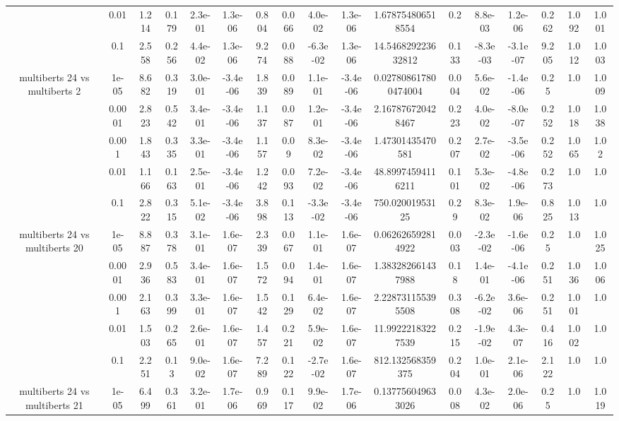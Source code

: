 \begin{tabular}{|c|c|c|c|c|c|c|c|c|c|c|c|c|c|c|c|c|}
 & 0.01 & 1.214 & 0.179 & 2.3e-01 & 1.3e-06 & 0.804 & 0.066 & 4.0e-02 & 1.3e-06 & 1.678754806518554 & 0.2 & 8.8e-03 & 1.2e-06 & 0.262 & 1.092 & 1.001 \\
 & 0.1 & 2.558 & 0.256 & 4.4e-02 & 1.3e-06 & 9.274 & 0.088 & -6.3e-02 & 1.3e-06 & 14.546829223632812 & 0.133 & -8.3e-03 & -3.1e-07 & 9.205 & 1.012 & 1.003 \\
\hline
\multirow{5}{*}{multiberts 24 vs multiberts 2} & 1e-05 & 8.682 & 0.319 & 3.0e-01 & -3.4e-06 & 1.839 & 0.089 & 1.1e-01 & -3.4e-06 & 0.027808617800474004 & 0.004 & 5.6e-02 & -1.4e-06 & 0.25 & 1.0 & 1.009 \\
 & 0.0001 & 2.823 & 0.542 & 3.4e-01 & -3.4e-06 & 1.137 & 0.087 & 1.2e-01 & -3.4e-06 & 2.167876720428467 & 0.223 & 4.0e-02 & -8.0e-07 & 0.252 & 1.018 & 1.038 \\
 & 0.001 & 1.843 & 0.335 & 3.3e-01 & -3.4e-06 & 1.157 & 0.09 & 8.3e-02 & -3.4e-06 & 1.47301435470581 & 0.207 & 2.7e-02 & -3.5e-06 & 0.252 & 1.065 & 1.02 \\
 & 0.01 & 1.166 & 0.163 & 2.5e-01 & -3.4e-06 & 1.242 & 0.093 & 7.2e-02 & -3.4e-06 & 48.89974594116211 & 0.101 & 5.3e-02 & -4.8e-06 & 0.273 & 1.0 & 1.0 \\
 & 0.1 & 2.822 & 0.315 & 5.1e-02 & -3.4e-06 & 3.898 & 0.113 & -3.3e-02 & -3.4e-06 & 750.02001953125 & 0.29 & 8.3e-02 & 1.9e-06 & 0.825 & 1.013 & 1.0 \\
\hline
\multirow{5}{*}{multiberts 24 vs multiberts 20} & 1e-05 & 8.887 & 0.378 & 3.1e-01 & 1.6e-07 & 2.339 & 0.067 & 1.1e-01 & 1.6e-07 & 0.062626592814922 & 0.003 & -2.3e-02 & -1.6e-06 & 0.25 & 1.0 & 1.025 \\
 & 0.0001 & 2.936 & 0.583 & 3.4e-01 & 1.6e-07 & 1.572 & 0.094 & 1.4e-01 & 1.6e-07 & 1.383282661437988 & 0.18 & 1.4e-01 & -4.1e-06 & 0.251 & 1.036 & 1.006 \\
 & 0.001 & 2.163 & 0.399 & 3.3e-01 & 1.6e-07 & 1.542 & 0.129 & 6.4e-02 & 1.6e-07 & 2.228731155395508 & 0.308 & -6.2e-02 & 3.6e-06 & 0.251 & 1.001 & 1.0 \\
 & 0.01 & 1.503 & 0.265 & 2.6e-01 & 1.6e-07 & 1.457 & 0.221 & 5.9e-02 & 1.6e-07 & 11.99222183227539 & 0.215 & -1.9e-02 & 4.3e-07 & 0.416 & 1.002 & 1.0 \\
 & 0.1 & 2.251 & 0.13 & 9.0e-02 & 1.6e-07 & 7.289 & 0.122 & -2.7e-02 & 1.6e-07 & 812.132568359375 & 0.204 & 1.0e-01 & 2.1e-06 & 2.122 & 1.0 & 1.0 \\
\hline
\multirow{5}{*}{multiberts 24 vs multiberts 21} & 1e-05 & 6.499 & 0.361 & 3.2e-01 & 1.7e-06 & 0.969 & 0.117 & 9.9e-02 & 1.7e-06 & 0.137756049633026 & 0.008 & 4.3e-02 & 2.0e-06 & 0.25 & 1.0 & 1.019 \\

\end{tabular}
